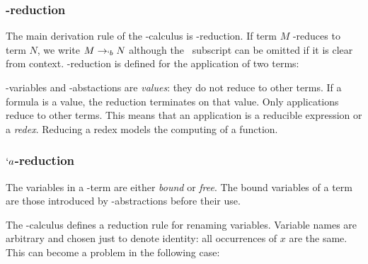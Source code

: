 \subsubsection{\bta-reduction}
  The main derivation rule of the \lam-calculus is \bta-reduction. If term
  $M$ \bta-reduces to term $N$, we write $M \rightarrow_{`b} N$ although 
  the \bta\ subscript can be omitted if it is clear from context. \bta-reduction
  is defined for the application of two terms:
  \begin{figure}[!h]\label{def:beta-reduction}
  \end{figure}
 
  \lam-variables and \lam-abstactions are \emph{values}: they do not reduce
  to other terms. If a formula is a value, the reduction terminates on that 
  value. Only applications reduce to other terms. This means that an 
  application is a reducible expression or a \emph{redex}. Reducing a 
  redex models the computing of a function. 

\subsubsection{$`a$-reduction}
 
  The variables in a \lam-term are either \emph{bound} or \emph{free}. 
  The bound variables of a term are those introduced by \lam-abstractions before their use.
 
 
  The \lam-calculus defines a reduction rule for renaming variables.
  Variable names are arbitrary and chosen just to denote identity:
  all occurrences of $x$ are the same. This can become a problem
  in the following case:
  
